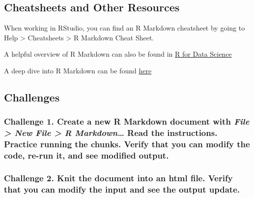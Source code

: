 \documentclass[]{book}
\begin{document}
\subsection{Cheatsheets and Other
Resources}\label{cheatsheets-and-other-resources}

When working in RStudio, you can find an R Markdown cheatsheet by going
to Help \textgreater{} Cheatsheets \textgreater{} R Markdown Cheat
Sheet.

A helpful overview of R Markdown can also be found in
\href{https://r4ds.had.co.nz/r-markdown.html}{R for Data Science}

A deep dive into R Markdown can be found
\href{https://bookdown.org/yihui/rmarkdown/}{here}

\subsection{Challenges}\label{challenges}

\subsubsection*{\texorpdfstring{Challenge 1. Create a new R Markdown
document with \emph{File \textgreater{} New File \textgreater{} R
Markdown\ldots{}} Read the instructions. Practice running the chunks.
Verify that you can modify the code, re-run it, and see modified
output.}{Challenge 1. Create a new R Markdown document with File \textgreater{} New File \textgreater{} R Markdown\ldots{} Read the instructions. Practice running the chunks. Verify that you can modify the code, re-run it, and see modified output.}}\label{challenge-1.-create-a-new-r-markdown-document-with-file-new-file-r-markdown-read-the-instructions.-practice-running-the-chunks.-verify-that-you-can-modify-the-code-re-run-it-and-see-modified-output.}

\subsubsection*{Challenge 2. Knit the document into an html file. Verify
that you can modify the input and see the output
update.}\label{challenge-2.-knit-the-document-into-an-html-file.-verify-that-you-can-modify-the-input-and-see-the-output-update.}
\end{document}
